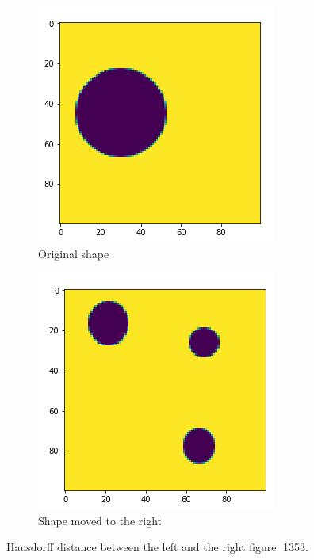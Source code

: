 \begin{figure}[H]
    \centering
    \begin{subfigure}{.5\textwidth}
        \centering
        \includegraphics[width=.75\linewidth]{chapters/06_hdm/images/hdm_original.png}
        \caption{Original shape}
    \end{subfigure}%
    \begin{subfigure}{.5\textwidth}
        \centering
        \includegraphics[width=.75\linewidth]{chapters/06_hdm/images/hdm_smaller_circles.png}
        \caption{Shape moved to the right}
    \end{subfigure}
    \caption{Hausdorff distance between the left and the right figure: 1353. }
    \label{hdm_smaller_circles}
\end{figure}
